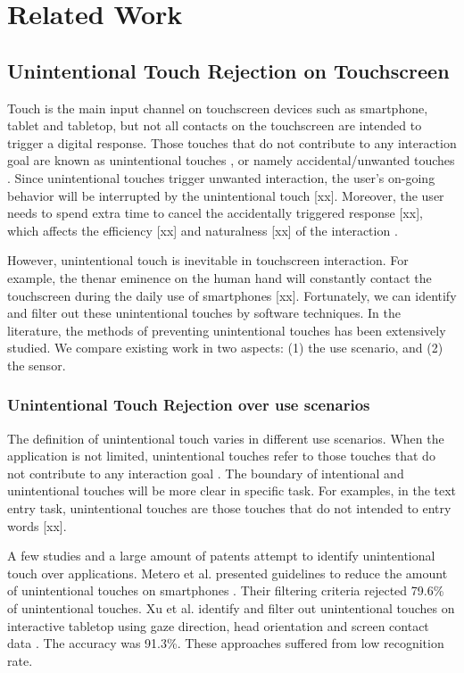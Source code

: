 \section{Related Work}

\subsection{Unintentional Touch Rejection on Touchscreen}

Touch is the main input channel on touchscreen devices such as smartphone, tablet and tabletop, but not all contacts on the touchscreen are intended to trigger a digital response. Those touches that do not contribute to any interaction goal are known as unintentional touches \cite{2020-TabletopTouch}, or namely accidental/unwanted touches \cite{2015-GestureOn,2012-IdentifyUnint}. Since unintentional touches trigger unwanted interaction, the user's on-going behavior will be interrupted by the unintentional touch [xx]. Moreover, the user needs to spend extra time to cancel the accidentally triggered response [xx], which affects the efficiency [xx] and naturalness [xx] of the interaction \cite{2014-PenMightier, 2020-TabletopTouch}.

However, unintentional touch is inevitable in touchscreen interaction. For example, the thenar eminence on the human hand will constantly contact the touchscreen during the daily use of smartphones [xx]. Fortunately, we can identify and filter out these unintentional touches by software techniques. In the literature, the methods of preventing unintentional touches has been extensively studied. We compare existing work in two aspects: (1) the use scenario, and (2) the sensor.

\subsubsection{Unintentional Touch Rejection over use scenarios}

The definition of unintentional touch varies in different use scenarios. When the application is not limited, unintentional touches refer to those touches that do not contribute to any interaction goal \cite{2020-TabletopTouch}. The boundary of intentional and unintentional touches will be more clear in specific task. For examples, in the text entry task, unintentional touches are those touches that do not intended to entry words [xx].

A few studies \cite{2012-IdentifyUnint,2020-TabletopTouch} and a large amount of patents \cite{2016-Classification,2006-PadUnint,2013-System,2013-Precluding,2015-TouchScreen} attempt to identify unintentional touch over applications. Metero et al. presented guidelines to reduce the amount of unintentional touches on smartphones \cite{2012-IdentifyUnint}. Their filtering criteria rejected 79.6\% of unintentional touches. Xu et al. identify and filter out unintentional touches on interactive tabletop using gaze direction, head orientation and screen contact data \cite{2020-TabletopTouch}. The accuracy was 91.3\%. These approaches suffered from low recognition rate.

